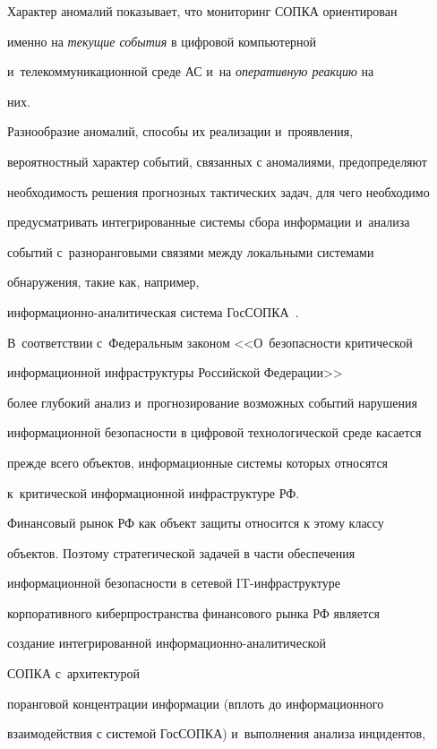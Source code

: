      

  Характер аномалий показывает, что мониторинг СОПКА ориентирован 

именно на \textit{текущие события} в цифровой компьютерной 

и~телекоммуникационной среде АС и~на \textit{оперативную реакцию} на 

них.

  

  Разнообразие аномалий, способы их реализации и~проявления, 

вероятностный характер событий, связанных с аномалиями, предопределяют 

необходимость решения прогнозных тактических задач, для чего необходимо 

предусматривать интегрированные системы сбора информации и~анализа 

событий с~разноранговыми связями между локальными системами 

обнаружения, такие как, например,  

ин\-фор\-ма\-ци\-он\-но-ана\-ли\-ти\-че\-ская система ГосСОПКА~\cite{4-zk}. 

В~соответствии с~Федеральным законом <<О~безопасности критической 

информационной инфраструктуры Российской Федерации>>~\cite{7-zk} 

более глубокий анализ и~прогнозирование возможных событий нарушения 

информационной безопасности в цифровой технологической среде касается 

прежде всего объектов, информационные системы которых относятся 

к~критической информационной инфраструктуре РФ. 

  

  Финансовый рынок РФ как объект защиты относится к этому классу 

объектов. Поэтому стратегической задачей в части обеспечения 

информационной безопасности в сетевой IT-инфра\-струк\-ту\-ре 

корпоративного киберпространства финансового рынка РФ является 

создание интегрированной ин\-фор\-ма\-ци\-он\-но-ана\-ли\-ти\-че\-ской 

СОПКА с~архитектурой 

поранговой концентрации информации (вплоть до информационного 

взаимодействия с системой ГосСОПКА) и~выполнения анализа инцидентов, 

